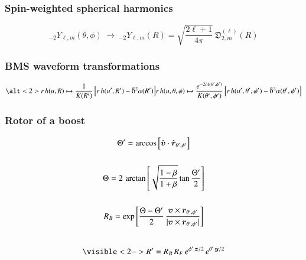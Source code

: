 \documentclass[12pt,xcolor={dvipsnames}]{beamer}
\renewcommand{\vec}{\bm}
\renewcommand{\vec}[1]{\boldsymbol{#1}}
\begin{document}


\begin{frame}
  \frametitle{Spin-weighted spherical harmonics}
  \begin{equation*}
    {}_{-2}Y_{\ell,m}(\theta, \phi)\ \longrightarrow\
    {}_{-2}Y_{\ell,m} (R)
    = \sqrt{\frac{2\ell+1} {4\pi}}\, \mathfrak{D}^{(\ell)}_{2,m}(R)
  \end{equation*}
\end{frame}

\begin{frame}
  \frametitle{BMS waveform transformations}
  \begin{equation*}
    \alt<2> %
    {r\, h(u, R) \mapsto \frac{1 \vphantom{e^{2}}} {K(R')} \left[ r\,
        h(u', R') - \bar{\eth}^{2} \alpha(R') \right]} %
    {r\, h(u, \theta, \phi) \mapsto \frac{e^{-2i \lambda(\theta', \phi')}}
      {K(\theta', \phi')} \left[ r\, h(u', \theta', \phi') -
        \bar{\eth}^{2} \alpha(\theta', \phi') \right]} %
  \end{equation*}
\end{frame}

\begin{frame}
  \frametitle{Rotor of a boost}
  \vspace{-0.3in}
  \begin{gather*}
    \Theta' = \arccos \left[ \hat{\vec{v}} \cdot
      \hat{\vec{r}}_{\theta', \phi'} \right]
    \\[15pt]
    \Theta = 2\, \arctan \left[ \sqrt{ \frac{1-\beta} {1+\beta} } \tan
      \frac{\Theta'}{2} \right]
    \\[15pt]
    R_{B} = \exp \left[ \frac{\Theta - \Theta'} {2}\, \frac{\vec{v}
        \times \vec{r}_{\theta', \phi'} } {\lvert \vec{v} \times
        \vec{r}_{\theta', \phi'} \rvert} \right]
    \\[20pt]
    \visible<2->{R' = R_{B}\, R_{F}\, e^{\phi'\, \vec{z}/2}\, e^{\theta'\,
        \vec{y}/2}}
  \end{gather*}
\end{frame}
\end{document}
